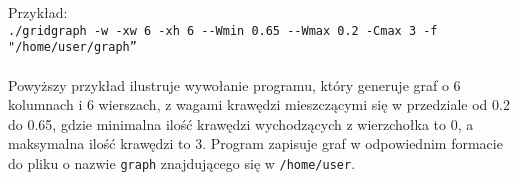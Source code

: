 \documentclass[11pt,a4paper]{report}
\begin{document}
    Przykład:\\
    \verb|./gridgraph -w -xw 6 -xh 6 --Wmin 0.65 --Wmax 0.2 -Cmax 3 -f "/home/user/graph”|
    \\
    \\
    Powyższy przykład ilustruje wywołanie programu, który generuje graf o 6 kolumnach i 6 wierszach, z wagami krawędzi mieszczącymi się w przedziale od 0.2 do 0.65, gdzie minimalna ilość krawędzi wychodzących z wierzchołka to 0, a maksymalna ilość krawędzi to 3. Program zapisuje graf w odpowiednim formacie do pliku o nazwie \verb|graph| znajdującego się w \verb|/home/user|.




    
\end{document}
